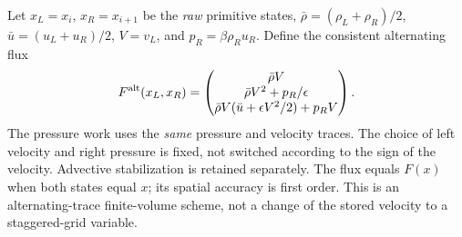 \documentclass[11pt]{article}
\begin{document}
Let $x_L=x_i$, $x_R=x_{i+1}$ be the \emph{raw} primitive states,
$\bar\rho=(\rho_L+\rho_R)/2$, $\bar u=(u_L+u_R)/2$, $V=v_L$,
and $p_R=\beta\rho_Ru_R$. Define the consistent alternating flux
\begin{equation}
 F^{\rm alt}(x_L,x_R)=
 \begin{pmatrix}
 \bar\rho V\\
 \bar\rho V^2+p_R/\epsilon\\
 \bar\rho V(\bar u+\epsilon V^2/2)+p_RV
 \end{pmatrix}.
 \label{eq:alternating}
\end{equation}
The pressure work uses the \emph{same} pressure and velocity traces.
The choice of left velocity and right pressure is fixed, not switched
according to the sign of the velocity. Advective stabilization is retained
separately. The flux equals $F(x)$ when both states equal $x$; its spatial
accuracy is first order. This is an alternating-trace finite-volume
scheme, not a change of the stored velocity to a staggered-grid variable.
\end{document}
